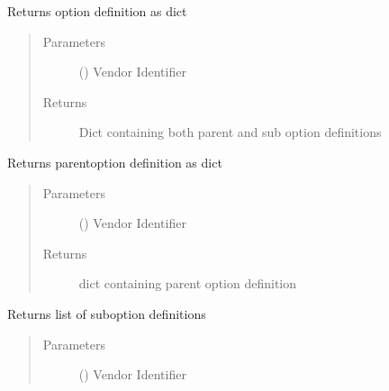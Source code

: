 \documentclass[letterpaper,10pt,english]{sphinxmanual}
\begin{document}
\begin{fulllineitems}
\begin{fulllineitems}
\label{\detokenize{dhcp-option-data-class:bloxone.DHCP_OPTION_DEFS.option_def}}
\sphinxAtStartPar
Returns option definition as dict
\begin{quote}\begin{description}
\item[{Parameters}] \leavevmode
\sphinxAtStartPar
{} () \textendash{} Vendor Identifier

\item[{Returns}] \leavevmode
\sphinxAtStartPar
Dict containing both parent and sub option definitions

\end{description}\end{quote}

\end{fulllineitems}


\begin{fulllineitems}
\label{\detokenize{dhcp-option-data-class:bloxone.DHCP_OPTION_DEFS.parent_opt_def}}
\sphinxAtStartPar
Returns parent\sphinxhyphen{}option definition as dict
\begin{quote}\begin{description}
\item[{Parameters}] \leavevmode
\sphinxAtStartPar
{} () \textendash{} Vendor Identifier

\item[{Returns}] \leavevmode
\sphinxAtStartPar
dict containing parent option definition

\end{description}\end{quote}

\end{fulllineitems}


\begin{fulllineitems}
\label{\detokenize{dhcp-option-data-class:bloxone.DHCP_OPTION_DEFS.sub_options}}
\sphinxAtStartPar
Returns list of sub\sphinxhyphen{}option definitions
\begin{quote}\begin{description}
\item[{Parameters}] \leavevmode
\sphinxAtStartPar
{} () \textendash{} Vendor Identifier


\end{description}
\end{quote}
\end{fulllineitems}
\end{fulllineitems}
\end{document}
